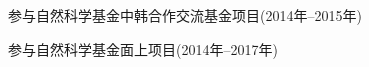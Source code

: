 
\begin{projects}{99}
    \item 参与自然科学基金中韩合作交流基金项目(2014年--2015年)
    \item 参与自然科学基金面上项目(2014年--2017年)
\end{projects}
